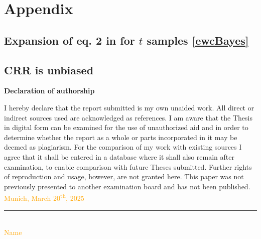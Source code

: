 \documentclass[12pt]{article}
\begin{document}
	
	\setcounter{page}{4} %
	
	\appendix
	
	\section{Appendix}
	\label{app}
	\subsection{Expansion of eq. 2 in \cite{JK} for \(t\) samples \eqref{ewcBayes}}
	\label{ewcB}
	
	\subsection{CRR is unbiased}
	\label{crr}
	
		
	\newpage
	
	
	\RaggedRight
	
	
	\newpage
	
	
	\Large
	\noindent
	\textbf{Declaration of authorship} 
	\vspace{0.5cm}
	\noindent
	\normalsize
	
	I hereby declare that the report submitted is my own unaided work. All direct 
	or indirect sources used are acknowledged as references. I am aware that the 
	Thesis in digital form can be examined for the use of unauthorized aid and in 
	order to determine whether the report as a whole or parts incorporated in it may 
	be deemed as plagiarism. For the comparison of my work with existing sources I 
	agree that it shall be entered in a database where it shall also remain after 
	examination, to enable comparison with future Theses submitted. Further rights 
	of reproduction and usage, however, are not granted here. This paper was not 
	previously presented to another examination board and has not been published.
	\\
	
	\vspace{1cm}
	\textcolor{orange}{Munich, March 20\textsuperscript{th}, 2025 } \\
	
	\vspace{3cm}
	
	\noindent\rule{0.5\textwidth}{0.4pt} \\
	
	\textcolor{orange}{Name}
	
	
\end{document}
